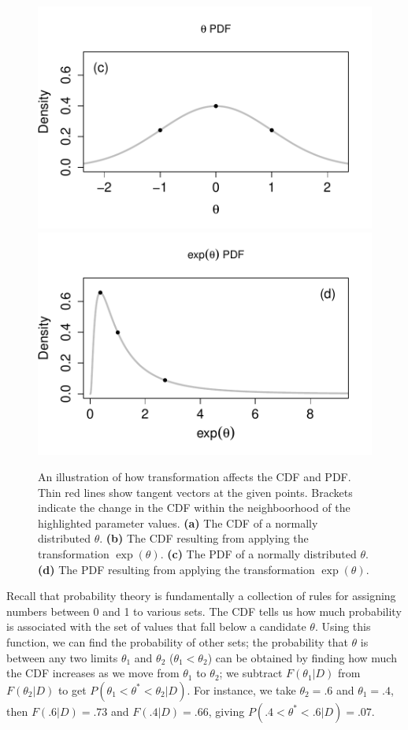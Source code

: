 \documentclass[9pt,twocolumn,twoside]{cidlab-draft}\templatetype{cidlab-invited}
\begin{document}
\begin{figure}[tb]
    \\
    \includegraphics[trim=0 15 30 40,clip,scale=.4]{p/figure2c.pdf}
    \includegraphics[trim=48 15 30 40,clip,scale=.4]{p/figure2d.pdf}
    \caption{An illustration of how transformation affects the CDF and PDF. Thin red lines show tangent vectors at the given points. Brackets indicate the change in the CDF within the neighboorhood of the highlighted parameter values. \textbf{(a)} The CDF of a normally distributed $\theta$. \textbf{(b)} The CDF resulting from applying the transformation $\exp(\theta)$. \textbf{(c)} The PDF of a normally distributed $\theta$. \textbf{(d)} The PDF resulting from applying the transformation $\exp(\theta)$.}
    \label{fig:normals}
\end{figure}

Recall that probability theory is fundamentally a collection of rules for assigning numbers between 0 and 1 to various sets. The CDF tells us how much probability is associated with the set of values that fall below a candidate $\theta$. Using this function, we can find the probability of other sets; the probability that $\theta$ is between any two limits $\theta_1$ and $\theta_2$ ($\theta_1<\theta_2$) can be obtained by finding how much the CDF increases as we move from $\theta_1$ to $\theta_2$; we subtract $F(\theta_1|D)$ from $F(\theta_2|D)$ to get $P(\theta_1<\theta^*<\theta_2|D)$. For instance, we take $\theta_2=.6$ and $\theta_1=.4$, then $F(.6|D)=.73$ and $F(.4|D)=.66$, giving $P(.4<\theta^*<.6|D)=.07$. 
\end{document}
